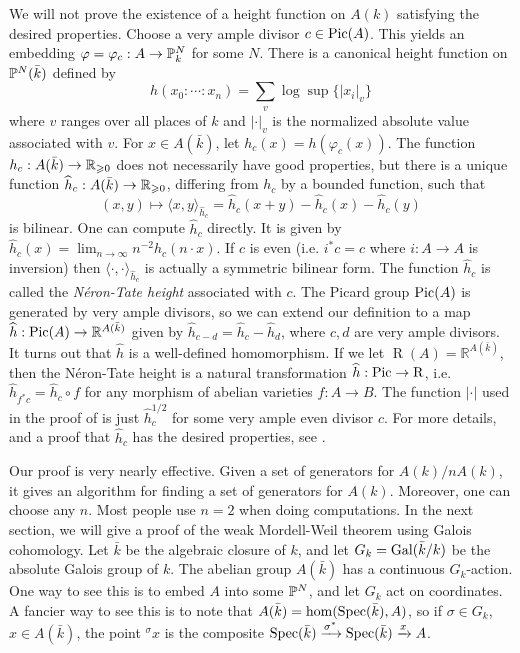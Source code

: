 \documentclass{article}
\begin{document}
We will not prove the existence of a height function on $A(k)$ satisfying the 
desired properties. Choose a very ample divisor $c\in \operatorname{Pic}(A)$. This yields 
an embedding $\varphi=\varphi_c:A\to \mathbb{P}_k^N$ for some $N$. There is a 
canonical height function on $\mathbb{P}^N(\bar k)$ defined by 
\[
  h(x_0:\dotsm : x_n) = \sum_v \log \sup\{|x_i|_v\}
\]
where $v$ ranges over all places of $k$ and $|\cdot|_v$ is the normalized 
absolute value associated with $v$. For $x\in A(\bar k)$, let 
$h_c(x) = h(\varphi_c(x))$. The function $h_c:A(\bar k)\to \mathbb{R}_{\geqslant 0}$ 
does not necessarily have good properties, but there is a unique function 
$\widehat h_c:A(\bar k)\to \mathbb{R}_{\geqslant 0}$, differing from $h_c$ by a 
bounded function, such that 
\[
  (x,y)\mapsto \langle x,y\rangle_{\widehat h_c} = \widehat h_c(x+y) - \widehat h_c(x) - \widehat h_c(y)
\]
is bilinear. One can compute $\widehat h_c$ directly. It is given by 
$\widehat h_c(x) = \lim_{n\to \infty} n^{-2} h_c(n\cdot x)$. If $c$ is even 
(i.e. $i^*c = c$ where $i:A\to A$ is inversion) then 
$\langle \cdot,\cdot\rangle_{\widehat h_c}$ is actually a symmetric bilinear 
form. The function $\widehat h_c$ is called the \emph{N\'eron-Tate height} 
associated with $c$. The Picard group $\operatorname{Pic}(A)$ is generated by very ample 
divisors, so we can extend our definition to a map 
$\widehat h:\operatorname{Pic}(A)\to \mathbb{R}^{A(\bar k)}$ given by 
$\widehat h_{c-d} = \widehat h_c - \widehat h_d$, where $c,d$ are very 
ample divisors. It turns out that $\widehat h$ is a well-defined 
homomorphism. If we let 
$\operatorname{R}(A) = \mathbb{R}^{A(\bar k)}$, then the N\'eron-Tate height 
is a natural transformation $\widehat h : \operatorname{Pic}\to \operatorname{R}$, 
i.e. $\widehat h_{f^* c} = \widehat h_c\circ f$ for any morphism of abelian 
varieties $f:A\to B$. The function $|\cdot|$ used in the proof of is just 
$\widehat h_c^{1/2}$ for some very ample even divisor $c$. For more details, 
and a proof that $\widehat h_c$ has the desired properties, see \cite[9.2]{bg06}.









Our proof is very nearly effective. Given a set of generators for 
$A(k)/n A(k)$, it gives an algorithm for finding a set of generators for 
$A(k)$. Moreover, one can choose any $n$. Most people use $n = 2$ when doing 
computations. In the next section, we will give a proof of the weak 
Mordell-Weil theorem using Galois cohomology. Let $\bar k$ be the algebraic 
closure of $k$, and let  $G_k = \operatorname{Gal}(\bar k/k)$ be the absolute Galois group of 
$k$. The abelian group $A(\bar k)$ has a continuous $G_k$-action. One way to 
see this is to embed $A$ into some $\mathbb{P}^N$, and let $G_k$ act on 
coordinates. A fancier way to see this is to note that 
$A(\bar k) = \hom(\operatorname{Spec}(\bar k),A)$, so if $\sigma\in G_k$, $x\in A(\bar k)$, 
the point $^\sigma x$ is the composite 
$\operatorname{Spec}(\bar k)\xrightarrow{\sigma^*} \operatorname{Spec}(\bar k) \xrightarrow{x} A$. 
\end{document}
